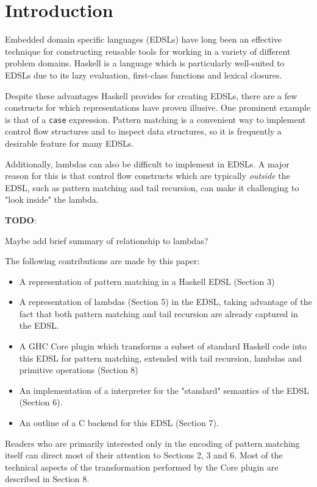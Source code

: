\documentclass[sigplan,anonymous,review]{acmart}
\newcommand{\ttt}{\texttt}
\newenvironment{todo}
  {\begin{tcolorbox}
   \textbf{TODO}:
  }
  {\end{tcolorbox}
  }
\begin{document}
\section{Introduction}

Embedded domain specific languages (EDSLs) have long been an effective
technique for constructing reusable tools for working in a variety of
different problem domains. Haskell is a language which is particularly
well-suited to EDSLs due to its lazy evaluation, first-class functions and
lexical closures.

Despite these advantages Haskell provides for creating EDSLs, there are a few
constructs for which representations have proven illusive. One prominent example
is that of a \ttt{case} expression. Pattern matching is a convenient way to
implement control flow structures and to inspect data structures, so it is
frequently a desirable feature for many EDSLs.

Additionally, lambdas can also be difficult to implement in EDSLs. A major reason
for this is that control flow constructs which are typically \textit{outside} the EDSL,
such as pattern matching and tail recursion, can make it challenging to "look inside"
the lambda.
\begin{todo}
  Maybe add brief summary of relationship to lambdas?
\end{todo}

The following contributions are made by this paper:

\begin{itemize}
\item A representation of pattern matching in a Haskell EDSL (Section 3)
\item A representation of lambdas (Section 5) in the EDSL, taking advantage of
  the fact that both pattern matching and tail recursion are already captured in
  the EDSL.
\item A GHC Core plugin which transforms a subset of standard Haskell code
  into this EDSL for pattern matching, extended with tail recursion,
  lambdas and primitive operations (Section 8)
\item An implementation of a interpreter for the "standard" semantics of the EDSL (Section 6).
\item An outline of a C backend for this EDSL (Section 7).
\end{itemize}

Readers who are primarily interested only in the encoding of pattern matching itself can direct
most of their attention to Sections 2, 3 and 6. Most of the technical aspects of
the transformation performed by the Core plugin are described in Section 8.
\end{document}
